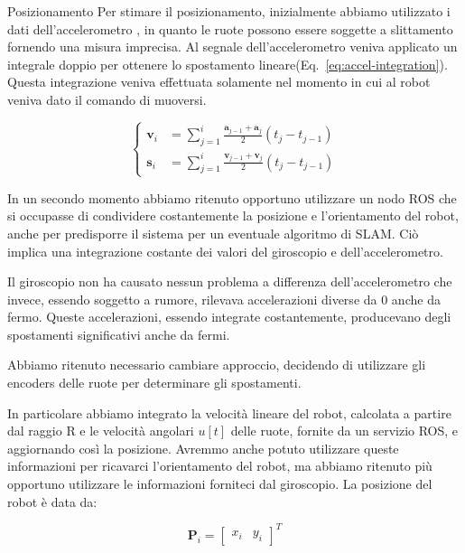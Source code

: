 \documentclass[10pt]{beamer}
\begin{document}
	\begin{frame}[allowframebreaks]{Posizionamento}
		Per stimare il posizionamento, inizialmente abbiamo utilizzato i dati dell'accelerometro
		\cite{positioning}, in quanto le ruote possono essere soggette a
		slittamento fornendo una misura imprecisa. Al segnale dell'accelerometro
		veniva applicato un integrale doppio per ottenere lo spostamento
		lineare(Eq.~\ref{eq:accel-integration}). Questa integrazione veniva effettuata solamente nel momento in cui al robot veniva dato il comando di muoversi.
		
		\begin{equation}\label{eq:accel-integration}
			\begin{cases}
				\textbf{v}_i & = \sum_{j=1}^{i} \frac{\textbf{a} _{j-1}+\textbf{a} _j}{2} \left( t_j-t_{j-1} \right) \\
				\textbf{s}_i & = \sum_{j=1}^{i} \frac{\textbf{v} _{j-1}+\textbf{v} _j}{2} \left( t_j-t_{j-1} \right) 
			\end{cases}
		\end{equation}
		
		In un secondo momento abbiamo ritenuto opportuno utilizzare un nodo ROS che
		si occupasse di condividere costantemente la posizione e l'orientamento del
		robot, anche per predisporre il sistema per un eventuale algoritmo di SLAM.
		Ciò implica una integrazione costante dei valori del giroscopio e
		dell'accelerometro. 
		
		Il giroscopio non ha causato nessun problema a differenza
		dell'accelerometro che invece, essendo soggetto a rumore, rilevava
		accelerazioni diverse da 0 anche da fermo. Queste accelerazioni, essendo
		integrate costantemente, producevano degli spostamenti significativi anche
		da fermi. 
		
		Abbiamo ritenuto necessario cambiare approccio, decidendo di utilizzare gli
		encoders delle ruote per determinare gli spostamenti. 
		
		In particolare abbiamo integrato la velocità lineare del robot, calcolata a
		partire dal raggio R e le velocità angolari $u[t]$ delle ruote, fornite da
		un servizio ROS, e aggiornando così la posizione. Avremmo anche potuto
		utilizzare queste informazioni per ricavarci l'orientamento del robot, ma
		abbiamo ritenuto più opportuno utilizzare le informazioni forniteci dal
		giroscopio. La posizione del robot è data da:
		
		\begin{equation}\label{eq:position-vector}
			\textbf{P}_i = \begin{bmatrix}
				  x_i & y_i  
			\end{bmatrix}^T
		\end{equation}
		

\end{frame}
\end{document}
